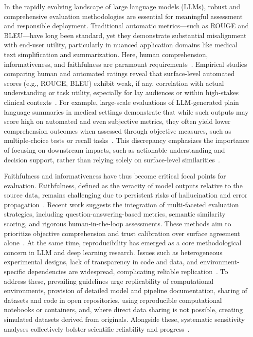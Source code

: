 \documentclass[sigconf]{acmart}
\begin{document}
In the rapidly evolving landscape of large language models (LLMs), robust and comprehensive evaluation methodologies are essential for meaningful assessment and responsible deployment. Traditional automatic metrics—such as ROUGE and BLEU—have long been standard, yet they demonstrate substantial misalignment with end-user utility, particularly in nuanced application domains like medical text simplification and summarization. Here, human comprehension, informativeness, and faithfulness are paramount requirements~\cite{ref76, ref91, ref94, ref106, ref108}. Empirical studies comparing human and automated ratings reveal that surface-level automated scores (e.g., ROUGE, BLEU) exhibit weak, if any, correlation with actual understanding or task utility, especially for lay audiences or within high-stakes clinical contexts~\cite{ref81, ref94, ref95, ref101, ref104, ref108}. For example, large-scale evaluations of LLM-generated plain language summaries in medical settings demonstrate that while such outputs may score high on automated and even subjective metrics, they often yield lower comprehension outcomes when assessed through objective measures, such as multiple-choice tests or recall tasks~\cite{ref81}. This discrepancy emphasizes the importance of focusing on downstream impacts, such as actionable understanding and decision support, rather than relying solely on surface-level similarities~\cite{ref81, ref94}.

Faithfulness and informativeness have thus become critical focal points for evaluation. Faithfulness, defined as the veracity of model outputs relative to the source data, remains challenging due to persistent risks of hallucination and error propagation~\cite{ref91, ref101, ref106, ref108}. Recent work suggests the integration of multi-faceted evaluation strategies, including question-answering-based metrics, semantic similarity scoring, and rigorous human-in-the-loop assessments. These methods aim to prioritize objective comprehension and trust calibration over surface agreement alone~\cite{ref94, ref101, ref104}. At the same time, reproducibility has emerged as a core methodological concern in LLM and deep learning research. Issues such as heterogeneous experimental designs, lack of transparency in code and data, and environment-specific dependencies are widespread, complicating reliable replication~\cite{ref76, ref95, ref106}. To address these, prevailing guidelines urge replicability of computational environments, provision of detailed model and pipeline documentation, sharing of datasets and code in open repositories, using reproducible computational notebooks or containers, and, where direct data sharing is not possible, creating simulated datasets derived from originals. Alongside these, systematic sensitivity analyses collectively bolster scientific reliability and progress~\cite{ref76, ref106, ref108}.
\end{document}

